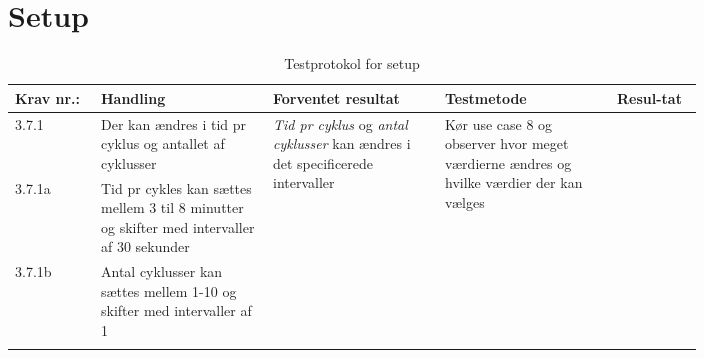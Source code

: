 				\section{Setup}
				\begin{longtable}{|p{0.1\linewidth}|p{0.2\linewidth}|p{0.2\linewidth}|p{0.2\linewidth}|p{0.1\linewidth}|}
					\hline
					\rowcolor{usDef}
					Krav nr.: & Handling & Forventet resultat & Testmetode & Resul-tat  \\\hline
					3.7.1& Der kan ændres i tid pr cyklus og antallet af cyklusser & \multirow{3}{\linewidth}{\textit{Tid pr cyklus} og \textit{antal cyklusser} kan ændres i det specificerede intervaller }  & \multirow{3}{\linewidth}{Kør use case 8 og observer hvor meget værdierne ændres og hvilke værdier der kan vælges}  & \multirow{3}{\linewidth}{}  \\ \cline{1-2}
					3.7.1a& Tid pr cykles kan sættes mellem 3 til 8 minutter og skifter med intervaller af 30 sekunder & &  & \\ \cline{1-2}
					3.7.1b& Antal cyklusser kan sættes mellem 1-10 og skifter med intervaller af 1& &  & \\ \hline
					\caption{Testprotokol for setup}
				\end{longtable}